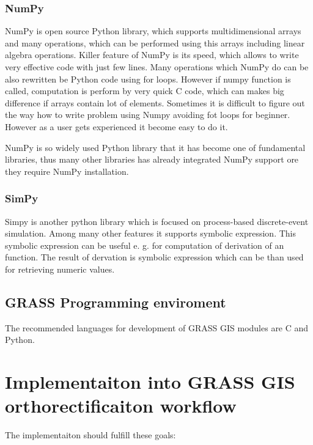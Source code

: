 \documentclass[a4paper,12pt]{report}
\begin{document}
\begin{itemize}
\subsubsection{NumPy}

NumPy is open source Python library, which supports multidimensional arrays and many operations, which can be
performed using this arrays including linear algebra operations. Killer feature of NumPy is its speed,
which allows to write very effective code with just few lines. Many operations which NumPy do can be 
also rewritten be Python code using  for loops. However if numpy function is called,
computation is perform by very quick C code, which can makes big difference if arrays contain 
lot of elements. Sometimes it is difficult to figure out the way how 
to write problem using Numpy avoiding fot loops  for beginner. However as a user gets experienced 
it become easy to do it. 

NumPy is so widely used Python library that it has become one of fundamental libraries, thus many
other libraries has already integrated NumPy support ore they require NumPy installation.

\subsubsection{SimPy}

Simpy is another python library which is focused on process-based discrete-event simulation.
Among many other features it supports symbolic expression. This symbolic expression can be useful
e. g. for computation of derivation of an function. The result of dervation is symbolic expression which can 
be than used for retrieving numeric values. 

\subsection{GRASS Programming  enviroment}

The recommended languages for development of GRASS GIS modules are C and Python.




\section{Implementaiton into GRASS GIS orthorectificaiton workflow}

The implementaiton should fulfill these goals:


\end{itemize}
\end{document}
